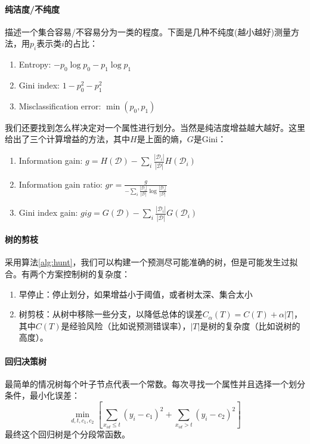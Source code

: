 \paragraph{纯洁度/不纯度} 描述一个集合容易/不容易分为一类的程度。下面是几种不纯度(越小越好)测量方法，用$p_i$表示类$i$的占比：
\begin{enumerate}
    \item Entropy: $-p_0\log p_0 - p_1\log p_1$
    \item Gini index: $1-p_0^2-p_1^2$
    \item Misclassification error: $\min(p_0, p_1)$
\end{enumerate}
我们还要找到怎么样决定对一个属性进行划分。当然是纯洁度增益越大越好。这里给出了三个计算增益的方法，其中$H$是上面的熵，$G$是Gini：
\begin{enumerate}
    \item Information gain: $g = H(\mathcal{D}) - \sum_i \frac{|\mathcal{D}_i|}{|\mathcal{D}|}H(\mathcal{D}_i)$
    \item Information gain ratio: $gr = \frac{g}{-\sum_i \frac{|\mathcal{D}_i|}{|\mathcal{D}|}\log \frac{|\mathcal{D}_i|}{|\mathcal{D}|}}$
    \item Gini index gain: $gig = G(\mathcal{D}) - \sum_i \frac{|\mathcal{D}_i|}{|\mathcal{D}|}G(\mathcal{D}_i)$
\end{enumerate}

\paragraph{树的剪枝}
采用算法\ref{alg:hunt}，我们可以构建一个预测尽可能准确的树，但是可能发生过拟合。有两个方案控制树的复杂度：
\begin{enumerate}
\item 早停止：停止划分，如果增益小于阈值，或者树太深、集合太小
\item 树剪枝：从树中移除一些分支，以降低总体的误差$C_\alpha(T) = C(T) + \alpha|T|$，其中$C(T)$是经验风险（比如说预测错误率），$|T|$是树的复杂度（比如说树的高度）。
\end{enumerate}

\paragraph{回归决策树}
最简单的情况树每个叶子节点代表一个常数。每次寻找一个属性并且选择一个划分条件，最小化误差：
$$\min_{d, t, c_1, c_2}\left[\sum_{x_{id} \le t}(y_i - c_1)^2 + \sum_{x_{id} > t}(y_i - c_2)^2\right]$$
最终这个回归树是个分段常函数。

